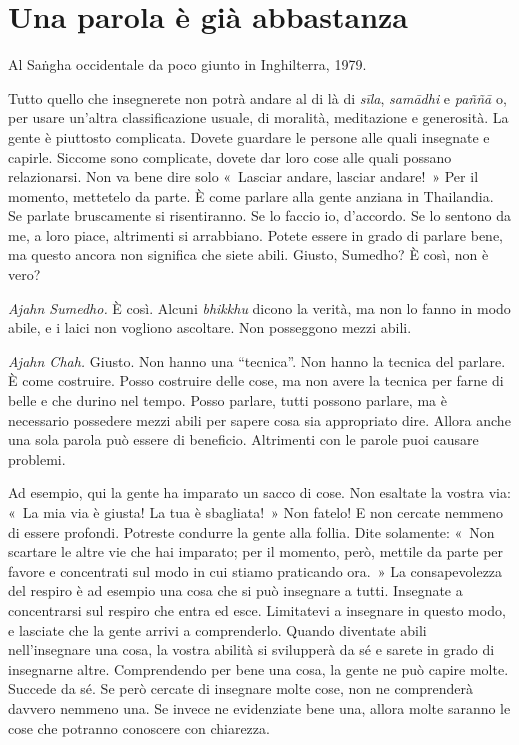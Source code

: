 \chapter{Una parola è già abbastanza}

\begin{openingQuote}
  \centering

  Al Saṅgha occidentale da poco giunto in Inghilterra, 1979.
\end{openingQuote}

Tutto quello che insegnerete non potrà andare al di là di \emph{sīla},
\emph{samādhi} e \emph{paññā} o, per usare un'altra classificazione
usuale, di moralità, meditazione e generosità. La gente è piuttosto
complicata. Dovete guardare le persone alle quali insegnate e capirle.
Siccome sono complicate, dovete dar loro cose alle quali possano
relazionarsi. Non va bene dire solo «~Lasciar andare, lasciar andare!~»
Per il momento, mettetelo da parte. È come parlare alla gente anziana in
Thailandia. Se parlate bruscamente si risentiranno. Se lo faccio io,
d'accordo. Se lo sentono da me, a loro piace, altrimenti si arrabbiano.
Potete essere in grado di parlare bene, ma questo ancora non significa
che siete abili. Giusto, Sumedho? È così, non è vero?

\emph{Ajahn Sumedho.} È così. Alcuni \emph{bhikkhu} dicono la verità, ma non lo
fanno in modo abile, e i laici non vogliono ascoltare. Non posseggono
mezzi abili.

\emph{Ajahn Chah.} Giusto. Non hanno una ``tecnica''. Non hanno la tecnica del
parlare. È come costruire. Posso costruire delle cose, ma non avere la
tecnica per farne di belle e che durino nel tempo. Posso parlare, tutti
possono parlare, ma è necessario possedere mezzi abili per sapere cosa
sia appropriato dire. Allora anche una sola parola può essere di
beneficio. Altrimenti con le parole puoi causare problemi.

Ad esempio, qui la gente ha imparato un sacco di cose. Non esaltate la
vostra via: «~La mia via è giusta! La tua è sbagliata!~» Non fatelo! E
non cercate nemmeno di essere profondi. Potreste condurre la gente alla
follia. Dite solamente: «~Non scartare le altre vie che hai imparato;
per il momento, però, mettile da parte per favore e concentrati sul modo
in cui stiamo praticando ora.~» La consapevolezza del respiro è ad
esempio una cosa che si può insegnare a tutti. Insegnate a concentrarsi
sul respiro che entra ed esce. Limitatevi a insegnare in questo modo, e
lasciate che la gente arrivi a comprenderlo. Quando diventate abili
nell'insegnare una cosa, la vostra abilità si svilupperà da sé e sarete
in grado di insegnarne altre. Comprendendo per bene una cosa, la gente
ne può capire molte. Succede da sé. Se però cercate di insegnare molte
cose, non ne comprenderà davvero nemmeno una. Se invece ne evidenziate
bene una, allora molte saranno le cose che potranno conoscere con
chiarezza.

